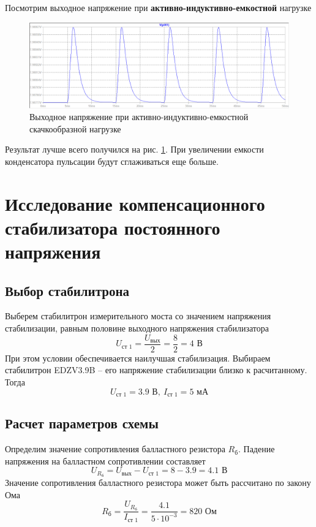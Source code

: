 \documentclass[a4paper, 12pt]{article}
\begin{document}
    \noindent Посмотрим выходное напряжение при \textbf{активно-индуктивно-емкостной} нагрузке
    \begin{figure}[H]
        \centering
        \includegraphics[scale=0.46]{2task_rect_ALC.png}
        \captionsetup{skip=0pt}
        \caption{Выходное напряжение при активно-индуктивно-емкостной скачкообразной нагрузке}
        \label{fig:2task_rect_ALC}
    \end{figure}
    \noindent Результат лучше всего получился на рис. \ref{fig:2task_rect_ALC}.
    При увеличении емкости конденсатора пульсации будут сглаживаться еще больше.


    \section{Исследование компенсационного стабилизатора постоянного напряжения}
    \subsection{Выбор стабилитрона}
    Выберем стабилитрон измерительного моста со значением напряжения
    стабилизации, равным половине выходного напряжения стабилизатора
    $$
    U_{\text{ст 1}}=\dfrac{U_{\text{вых}}}{2}=\dfrac{8}{2}=4\text{ В}
    $$
    При этом условии обеспечивается наилучшая стабилизация.
    Выбираем стабилитрон EDZV3.9B -- его напряжение стабилизации
    близко к расчитанному. Тогда
    $$
    U_{\text{ст 1}}=3.9\text{ В},\ I_{\text{ст 1}}=5\text{ мА}
    $$


    \subsection{Расчет параметров схемы}
    Определим значение сопротивления балластного резистора
    $R_{\text{б}}$. Падение напряжения на балластном сопротивлении
    составляет
    $$
    U_{R_\text{б}}=U_{\text{вых}}-U_{\text{ст 1}}=8-3.9=4.1\text{ В}
    $$
    Значение сопротивления балластного резистора может быть рассчитано по закону Ома
    $$
    R_{\text{б}}=\dfrac{U_{R_\text{б}}}{I_{\text{ст 1}}}=\dfrac{4.1}{5\cdot10^{-3}}=820\text{ Ом}
    $$
\end{document}
